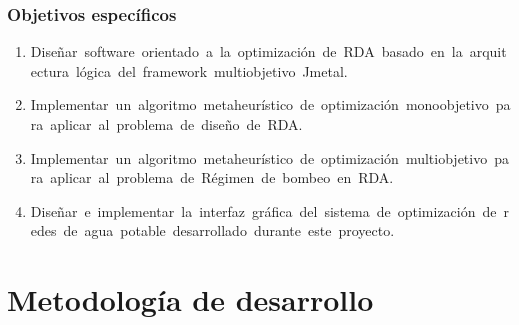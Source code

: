 \documentclass[9pt]{beamer}
\begin{document}
    \begin{frame}
        \frametitle{Objetivos específicos}
        \begin{enumerate}
            \justifying
            \item Diseñar software orientado a la optimización de RDA basado en la arquitectura lógica del framework multiobjetivo Jmetal.
            \item Implementar un algoritmo metaheurístico de optimización monoobjetivo para aplicar al problema de diseño de RDA.
            \item Implementar un algoritmo metaheurístico de optimización multiobjetivo para aplicar al problema de Régimen de bombeo en RDA.
            \item Diseñar e implementar la interfaz gráfica del sistema de optimización de redes de agua potable desarrollado durante este proyecto.
        \end{enumerate}
    \end{frame}

    \section{Metodología de desarrollo}
\end{document}

